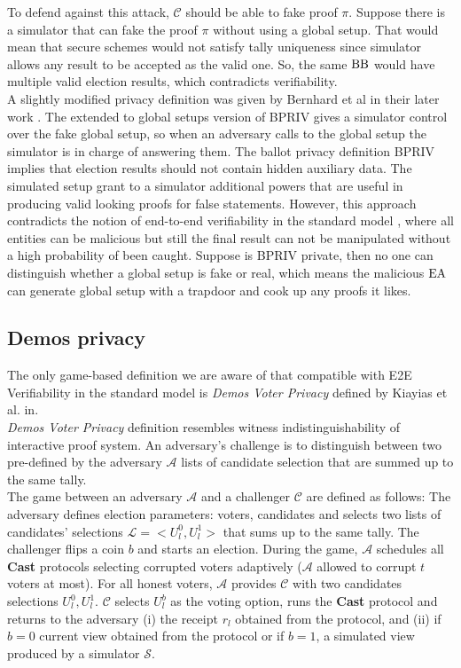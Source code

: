 To defend against this attack, $\mathcal{C}$ should be able to fake proof $\pi$. Suppose there is a simulator that can fake the proof $\pi$ without using a global setup. That would mean that secure schemes would not satisfy tally uniqueness since simulator allows any result to be accepted as the valid one. So, the same $\operatorname{BB}$ would have multiple valid election results, which contradicts verifiability. \\ 

A slightly modified privacy definition was given by Bernhard et al in their later work \cite{Bernhard2015}. The extended to global setups version of BPRIV gives a simulator control over the fake global setup, so when an adversary calls to the global setup the simulator is in charge of answering them. The ballot privacy definition BPRIV implies that election results should not contain hidden auxiliary data. The simulated setup grant to a simulator additional powers that are useful in producing valid looking proofs for false statements. However, this approach contradicts the notion of end-to-end verifiability in the standard model \cite{Kiayias2015a}, where all entities can be malicious but still the final result can not be manipulated without a high probability of been caught. Suppose is BPRIV private, then no one can distinguish whether a global setup is fake or real, which means the malicious $\operatorname{EA}$ can generate global setup with a trapdoor and cook up any proofs it likes. 

 \subsection{Demos privacy}
 \label{demospriv}
 The only game-based definition we are aware of that compatible with E2E Verifiability in the standard model is \textit{Demos Voter Privacy} defined by Kiayias et al. in\cite{Kiayias2015a}. \\
 
 \textit{Demos Voter Privacy} definition resembles witness indistinguishability of interactive proof system. An adversary's challenge is to distinguish between two pre-defined by the adversary  $\mathcal{A}$ lists of candidate selection that are summed up  to the same tally. \\
 
 The game between an adversary $\mathcal{A}$ and a challenger $\mathcal{C}$ are defined as follows: The adversary defines election parameters: voters, candidates and selects two lists of candidates' selections $\mathcal{L} = <U_l^0, U_l^1>$  that sums up to the same tally. The challenger flips a coin $b$ and starts an election. During the game,   $\mathcal{A}$ schedules all \textbf{Cast} protocols selecting corrupted voters adaptively ($\mathcal{A}$ allowed to corrupt $t$ voters at most). For all honest voters,  $\mathcal{A}$ provides $\mathcal{C}$ with two candidates selections $U_l^0, U_l^1$. $\mathcal{C}$ selects $U_l^b$ as the voting option, runs the \textbf{Cast}  protocol and returns to the adversary (i) the receipt $r_l$ obtained from the protocol, and (ii) if $b = 0$ current view obtained from the protocol or if $b =1$, a simulated view produced by a simulator $\mathcal{S}$. \\
 
